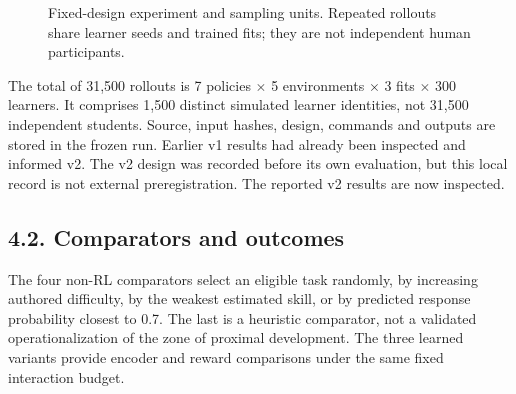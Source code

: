 \documentclass[preprint,11pt,authoryear]{elsarticle}
\begin{document}
\begin{figure}[htbp]\centering


\caption{Fixed-design experiment and sampling units. Repeated rollouts share learner seeds and trained fits; they are not independent human participants.}\end{figure}

The total of 31,500 rollouts is 7 policies \ensuremath{\times} 5 environments \ensuremath{\times} 3 fits \ensuremath{\times} 300 learners. It comprises 1,500 distinct simulated learner identities, not 31,500 independent students. Source, input hashes, design, commands and outputs are stored in the frozen run. Earlier v1 results had already been inspected and informed v2. The v2 design was recorded before its own evaluation, but this local record is not external preregistration. The reported v2 results are now inspected.

\subsection*{4.2. Comparators and outcomes}

The four non-RL comparators select an eligible task randomly, by increasing authored difficulty, by the weakest estimated skill, or by predicted response probability closest to 0.7. The last is a heuristic comparator, not a validated operationalization of the zone of proximal development. The three learned variants provide encoder and reward comparisons under the same fixed interaction budget.
\end{document}
